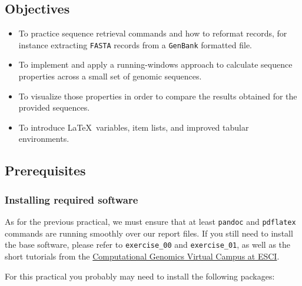 \documentclass[10pt,a4paper,]{article}
\providecommand{\tightlist}{%
  \setlength{\itemsep}{0pt}\setlength{\parskip}{0pt}}
\begin{document}
\hypertarget{objectives}{%
\subsection{Objectives}\label{objectives}}

\begin{itemize}
\tightlist
\item
  To practice sequence retrieval commands and how to reformat records,
  for instance extracting \texttt{FASTA} records from a \texttt{GenBank}
  formatted file.
\item
  To implement and apply a running-windows approach to calculate
  sequence properties across a small set of genomic sequences.
\item
  To visualize those properties in order to compare the results obtained
  for the provided sequences.
\item
  To introduce \LaTeX~variables, item lists, and improved tabular
  environments.
\end{itemize}

\hypertarget{prerequisites}{%
\subsection{Prerequisites}\label{prerequisites}}

\hypertarget{installing-required-software}{%
\subsubsection{Installing required
software}\label{installing-required-software}}

As for the previous practical, we must ensure that at least
\texttt{pandoc} and \texttt{pdflatex} commands are running smoothly over
our report files. If you still need to install the base software, please
refer to \texttt{exercise\_00} and \texttt{exercise\_01}, as well as the
short tutorials from the
\href{https://aula.esci.upf.edu/course/view.php?id=5915}{Computational Genomics Virtual Campus at ESCI}.

For this practical you probably may need to install the following
packages:
\end{document}
